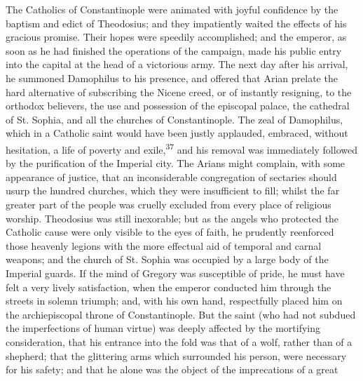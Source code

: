 

The Catholics of Constantinople were animated with joyful
confidence by the baptism and edict of Theodosius; and they
impatiently waited the effects of his gracious promise. Their
hopes were speedily accomplished; and the emperor, as soon as he
had finished the operations of the campaign, made his public
entry into the capital at the head of a victorious army. The next
day after his arrival, he summoned Damophilus to his presence,
and offered that Arian prelate the hard alternative of
subscribing the Nicene creed, or of instantly resigning, to the
orthodox believers, the use and possession of the episcopal
palace, the cathedral of St. Sophia, and all the churches of
Constantinople. The zeal of Damophilus, which in a Catholic saint
would have been justly applauded, embraced, without hesitation, a
life of poverty and exile,\textsuperscript{37} and his removal was immediately
followed by the purification of the Imperial city. The Arians
might complain, with some appearance of justice, that an
inconsiderable congregation of sectaries should usurp the hundred
churches, which they were insufficient to fill; whilst the far
greater part of the people was cruelly excluded from every place
of religious worship. Theodosius was still inexorable; but as the
angels who protected the Catholic cause were only visible to the
eyes of faith, he prudently reenforced those heavenly legions
with the more effectual aid of temporal and carnal weapons; and
the church of St. Sophia was occupied by a large body of the
Imperial guards. If the mind of Gregory was susceptible of pride,
he must have felt a very lively satisfaction, when the emperor
conducted him through the streets in solemn triumph; and, with
his own hand, respectfully placed him on the archiepiscopal
throne of Constantinople. But the saint (who had not subdued the
imperfections of human virtue) was deeply affected by the
mortifying consideration, that his entrance into the fold was
that of a wolf, rather than of a shepherd; that the glittering
arms which surrounded his person, were necessary for his safety;
and that he alone was the object of the imprecations of a great
